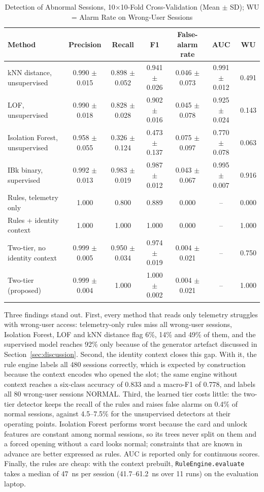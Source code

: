 \begin{table}[t]
\centering
\small
\caption{Detection of Abnormal Sessions, 10$\times$10-Fold Cross-Validation (Mean $\pm$ SD); WU = Alarm Rate on
Wrong-User Sessions}
\label{tab:detect}
\begin{tabular}{l c c c c c c}
\toprule
Method & Precision & Recall & F1 & False-alarm rate & AUC & WU \\
\midrule
kNN distance, unsupervised     & 0.990 $\pm$ 0.015 & 0.898 $\pm$ 0.052 & 0.941 $\pm$ 0.026 & 0.046 $\pm$ 0.073 & 0.991 $\pm$ 0.012 & 0.491 \\
LOF, unsupervised              & 0.990 $\pm$ 0.018 & 0.828 $\pm$ 0.028 & 0.902 $\pm$ 0.016 & 0.045 $\pm$ 0.078 & 0.925 $\pm$ 0.024 & 0.143 \\
Isolation Forest, unsupervised & 0.958 $\pm$ 0.055 & 0.326 $\pm$ 0.124 & 0.473 $\pm$ 0.137 & 0.075 $\pm$ 0.097 & 0.770 $\pm$ 0.078 & 0.063 \\
IBk binary, supervised         & 0.992 $\pm$ 0.013 & 0.983 $\pm$ 0.019 & 0.987 $\pm$ 0.012 & 0.043 $\pm$ 0.067 & 0.995 $\pm$ 0.007 & 0.916 \\
\midrule
Rules, telemetry only          & 1.000 & 0.800 & 0.889 & 0.000 & -- & 0.000 \\
Rules + identity context       & 1.000 & 1.000 & 1.000 & 0.000 & -- & 1.000 \\
Two-tier, no identity context  & 0.999 $\pm$ 0.005 & 0.950 $\pm$ 0.034 & 0.974 $\pm$ 0.019 & 0.004 $\pm$ 0.021 & -- & 0.750 \\
Two-tier (proposed)            & 0.999 $\pm$ 0.004 & 1.000 & 1.000 $\pm$ 0.002 & 0.004 $\pm$ 0.021 & -- & 1.000 \\
\bottomrule
\end{tabular}
\end{table}

Three findings stand out. First, every method that reads only telemetry struggles with wrong-user access: telemetry-only
rules miss all wrong-user sessions, Isolation Forest, LOF and kNN distance flag 6\%, 14\% and 49\% of them, and the
supervised model reaches 92\% only because of the generator artefact discussed in Section~\ref{sec:discussion}. Second,
the identity context closes this gap. With it, the rule engine labels all 480 sessions correctly, which is expected by
construction because the context encodes who opened the slot; the same engine without context reaches a six-class
accuracy of 0.833 and a macro-F1 of 0.778, and labels all 80 wrong-user sessions NORMAL. Third, the learned tier costs
little: the two-tier detector keeps the recall of the rules and raises false alarms on 0.4\% of normal sessions,
against 4.5--7.5\% for the unsupervised detectors at their operating points. Isolation Forest performs worst because the
card and unlock features are constant among normal sessions, so its trees never split on them and a forced opening
without a card looks normal; constraints that are known in advance are better expressed as rules. AUC is reported only
for continuous scores. Finally, the rules are cheap: with the context prebuilt, \texttt{RuleEngine.evaluate} takes a
median of 47~ns per session (41.7--61.2~ns over 11 runs) on the evaluation laptop.

